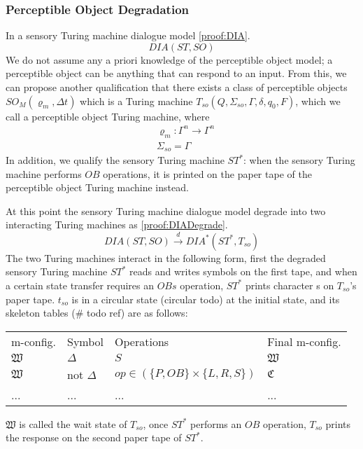 \subsubsection{Perceptible Object Degradation}
In a sensory Turing machine dialogue model \ref{proof:DIA}.
\begin{equation}\label{proof:DIA}
    DIA(ST, SO)
\end{equation}
We do not assume any a priori knowledge of the perceptible object model; a perceptible object can be anything that can respond to an input. From this, we can propose another qualification that there exists a class of perceptible objects $SO_M (\varrho_m,\Delta t)$ which is a Turing machine $T_{so} (Q,\Sigma_{so},\Gamma,\delta,q_0,F)$, which we call a perceptible object Turing machine, where
\begin{align}
    &\varrho_m: \Gamma^n \to \Gamma^n \\
    &\Sigma_{so} = \Gamma
\end{align}
In addition, we qualify the sensory Turing machine $ST^*$: when the sensory Turing machine performs $OB$ operations, it is printed on the paper tape of the perceptible object Turing machine instead.

At this point the sensory Turing machine dialogue model degrade into two interacting Turing machines as \ref{proof:DIADegrade}.
\begin{equation}\label{proof:DIADegrade}
    DIA(ST, SO) \stackrel{d}{\to} DIA^*(ST^*, T_{so})
\end{equation}
The two Turing machines interact in the following form, first the degraded sensory Turing machine $ST^*$ reads and writes symbols on the first tape, and when a certain state transfer requires an $OBs$ operation, $ST^*$ prints character s on $T_{so}$'s paper tape. $t_{so}$ is in a circular state (circular todo) at the initial state, and its skeleton tables (\# todo ref) are as follows:
\begin{center}
\begin{tabular}{llll}
    m-config. & Symbol & Operations & Final m-config. \\
    $\mathfrak{W}$ & $\Delta$ & $S$ & $\mathfrak{W}$ \\
    $\mathfrak{W}$ & not $\Delta$ & $op \in (\{P, OB\} \times \{L, R, S\})$ & $\mathfrak{C}$ \\
    ... & ... & ... & ...
\end{tabular}
\end{center}
$\mathfrak{W}$ is called the wait state of $T_{so}$, once $ST^*$ performs an $OB$ operation, $T_{so}$ prints the response on the second paper tape of $ST^*$.


